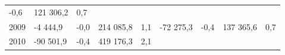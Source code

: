 \begin{longtable}[]{@{}lllllllll@{}}
\begin{minipage}[t]{0.06\columnwidth}
-0,6\strut
\end{minipage} & \begin{minipage}[t]{0.08\columnwidth}\raggedright
121 306,2\strut
\end{minipage} & \begin{minipage}[t]{0.06\columnwidth}\raggedright
0,7\strut
\end{minipage}\tabularnewline
\begin{minipage}[t]{0.05\columnwidth}\raggedright
2009\strut
\end{minipage} & \begin{minipage}[t]{0.10\columnwidth}\raggedright
-4 444,9\strut
\end{minipage} & \begin{minipage}[t]{0.06\columnwidth}\raggedright
-0,0\strut
\end{minipage} & \begin{minipage}[t]{0.17\columnwidth}\raggedright
214 085,8\strut
\end{minipage} & \begin{minipage}[t]{0.06\columnwidth}\raggedright
1,1\strut
\end{minipage} & \begin{minipage}[t]{0.12\columnwidth}\raggedright
-72 275,3\strut
\end{minipage} & \begin{minipage}[t]{0.06\columnwidth}\raggedright
-0,4\strut
\end{minipage} & \begin{minipage}[t]{0.08\columnwidth}\raggedright
137 365,6\strut
\end{minipage} & \begin{minipage}[t]{0.06\columnwidth}\raggedright
0,7\strut
\end{minipage}\tabularnewline
\begin{minipage}[t]{0.05\columnwidth}\raggedright
2010\strut
\end{minipage} & \begin{minipage}[t]{0.10\columnwidth}\raggedright
-90 501,9\strut
\end{minipage} & \begin{minipage}[t]{0.06\columnwidth}\raggedright
-0,4\strut
\end{minipage} & \begin{minipage}[t]{0.17\columnwidth}\raggedright
419 176,3\strut
\end{minipage} & \begin{minipage}[t]{0.06\columnwidth}\raggedright
2,1\strut
\end{minipage} & \begin{minipage}[t]{0.12\columnwidth}\raggedright

\end{minipage}
\end{longtable}
